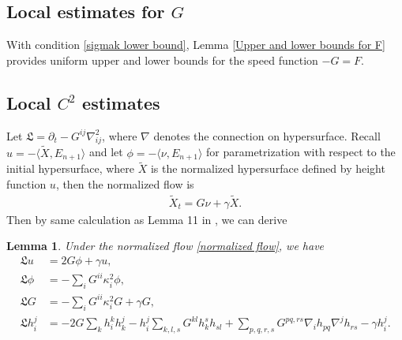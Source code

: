 \documentclass[reqno]{amsart}
\newtheorem{lemma}[theorem]{Lemma}
\theoremstyle{remark}
\theoremstyle{definition}
\numberwithin{equation}{section}
\begin{document}


\subsection{Local estimates for \texorpdfstring{$G$}{G}}

With condition \eqref{sigmak lower bound}, Lemma \ref{Upper and lower bounds for F} provides uniform upper and lower bounds for the speed function $-G = F$. 


\subsection{Local \texorpdfstring{$C^2$}{C2} estimates}

Let $\mathfrak{L} = \partial_t - G^{ij}\nabla^2_{ij}$, where $\nabla$ denotes the connection on hypersurface. Recall $u = -\langle \tilde{X}, E_{n+1} \rangle$ and let $\phi = -\langle \nu, E_{n+1} \rangle$ for parametrization with respect to the initial hypersurface, where $\tilde{X}$ is the normalized hypersurface defined by height function $u$, then the normalized flow is 
\begin{align}\label{normalized flow}
    \tilde{X}_t = G \nu + \gamma \tilde{X}.
\end{align}
Then by same calculation as Lemma 11 in \cite{Entiresigmakcurvatureflow}, we can derive
\begin{lemma}\label{evolution for some geometric quantity}
    Under the normalized flow \eqref{normalized flow}, we have
    \begin{align*}
        \mathfrak{L} u &= 2G\phi + \gamma u, \\
        \mathfrak{L} \phi &= -\sum_i G^{ii}\kappa_i^2 \phi, \\
        \mathfrak{L} G &= -\sum_i G^{ii}\kappa_i^2 G + \gamma G, \\
        \mathfrak{L} h_{i}^{j} &= -2G \sum_k h_{i}^{k} h_{k}^{j} - h_{i}^{j} \sum_{k,l,s} G^{kl} h_k^s h_{sl} + \sum_{p,q,r,s} G^{pq,rs} \nabla_i h_{pq} \nabla^j h_{rs} - \gamma h_{i}^{j}.
    \end{align*}
\end{lemma}
\end{document}
